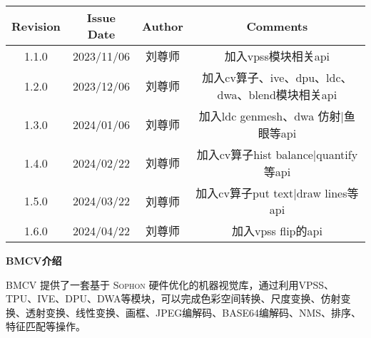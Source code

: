 \begin{center}
    \begin{table}[htb]
    \begin{adjustbox}{width=1\textwidth}
    \begin{tabular}{|>{\normalsize}c|>{\normalsize}c|>{\normalsize}c|>{\normalsize}c|}
    \hline
    \rowcolor[HTML]{C0C0C0}
    \textbf{Revision} & \textbf{Issue Date} & \textbf{Author} & \textbf{Comments}  \\ \hline
    1.1.0             & 2023/11/06          & 刘尊师             & 加入vpss模块相关api \\ \hline
    1.2.0             & 2023/12/06          & 刘尊师             & 加入cv算子、ive、dpu、ldc、dwa、blend模块相关api \\ \hline
    1.3.0             & 2024/01/06          & 刘尊师             & 加入ldc genmesh、dwa 仿射|鱼眼等api \\ \hline
    1.4.0             & 2024/02/22          & 刘尊师             & 加入cv算子hist balance|quantify等api \\ \hline
    1.5.0             & 2024/03/22          & 刘尊师             & 加入cv算子put text|draw lines等api \\ \hline
    1.6.0             & 2024/04/22          & 刘尊师             & 加入vpss flip的api \\ \hline
    \end{tabular}
    \end{adjustbox}
    \end{table}
\end{center}
\newpage
\thispagestyle{normal}
\begin{center}
    \Large \textbf{BMCV介绍}
    \vspace*{0.5cm}
\end{center}

\begin{flushleft}
    \normalsize \textsc{BMCV 提供了一套基于 Sophon 硬件优化的机器视觉库，通过利用VPSS、TPU、IVE、DPU、DWA等模块，可以完成色彩空间转换、尺度变换、仿射变换、透射变换、线性变换、画框、JPEG编解码、BASE64编解码、NMS、排序、特征匹配等操作。}\tabularnewline
\end{flushleft}

\newpage
